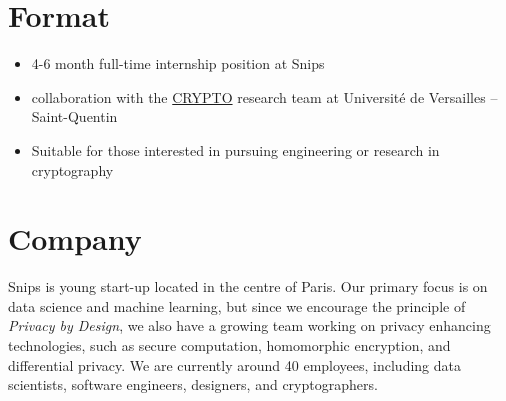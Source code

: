 \documentclass{article}
\begin{document}
\section*{Format}
\begin{itemize}
\item 4-6 month full-time internship position at Snips
\item collaboration with the
  \href{http://lmv.math.cnrs.fr/equipes/crypto/}{CRYPTO} research team
  at Université de Versailles -- Saint-Quentin
\item Suitable for those interested in pursuing engineering or research in cryptography
\end{itemize}

\section*{Company}
Snips is young start-up located in the centre of Paris. Our primary focus is on data science and machine learning, but since we encourage the principle of \emph{Privacy by Design}, we also have a growing team working on privacy enhancing technologies, such as secure computation, homomorphic encryption, and differential privacy. We are currently around 40 employees, including data scientists, software engineers, designers, and cryptographers.
\end{document}
